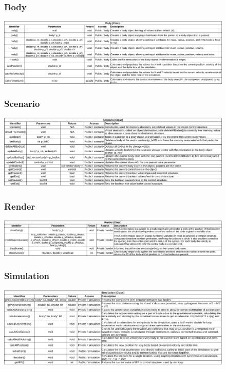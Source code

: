 \begin{figure}
  \subsubsection{Body}
  \centering  
  \includegraphics[width=\textwidth]{img/functions/body.png}
\end{figure}

\begin{figure}
  \subsubsection{Scenario}
  \centering  
  \includegraphics[width=\textwidth]{img/functions/scenario.png}
\end{figure}

\begin{figure}
  \subsubsection{Render}
  \centering  
  \includegraphics[width=\textwidth]{img/functions/render.png}
\end{figure}

\begin{figure}
  \subsubsection{Simulation}
  \centering  
  \includegraphics[width=\textwidth]{img/functions/simulation.png}
\end{figure}

